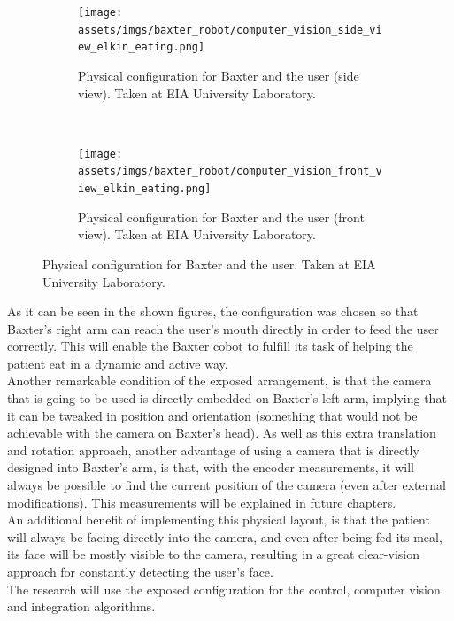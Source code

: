 \documentclass[11pt]{report} %
\begin{document}
\begin{figure}[H]
	\centering
	\begin{subfigure}{.5\textwidth}
		\centering
		\texttt{[image: assets/imgs/baxter\_robot/computer\_vision\_side\_view\_elkin\_eating.png]}
		\caption{Physical configuration for Baxter and the user (side view). Taken at EIA University Laboratory.}
		\label{fig_baxter_configuration_2a}
	\end{subfigure}~
	\begin{subfigure}{.5\textwidth}
		\centering
		\texttt{[image: assets/imgs/baxter\_robot/computer\_vision\_front\_view\_elkin\_eating.png]}
		\caption{Physical configuration for Baxter and the user (front view). Taken at EIA University Laboratory.}
		\label{fig_baxter_configuration_2b}
	\end{subfigure}%
	\caption{Physical configuration for Baxter and the user. Taken at EIA University Laboratory.}
	\label{fig_baxter_configuration_2}
\end{figure}


As it can be seen in the shown figures, the configuration was chosen so that Baxter's right arm can reach the user's mouth directly in order to feed the user correctly. This will enable the Baxter cobot to fulfill its task of helping the patient eat in a dynamic and active way.\\

Another remarkable condition of the exposed arrangement, is that the camera that is going to be used is directly embedded on Baxter's left arm, implying that it can be tweaked in position and orientation (something that would not be achievable with the camera on Baxter's head). As well as this extra translation and rotation approach, another advantage of using a camera that is directly designed into Baxter's arm, is that, with the encoder measurements, it will always be possible to find the current position of the camera (even after external modifications). This measurements will be explained in future chapters.\\

An additional benefit of implementing this physical layout, is that the patient will always be facing directly into the camera, and even after being fed its meal, its face will be mostly visible to the camera, resulting in a great clear-vision approach for constantly detecting the user's face.\\

The research will use the exposed configuration for the control, computer vision and integration algorithms.\\
\end{document}
